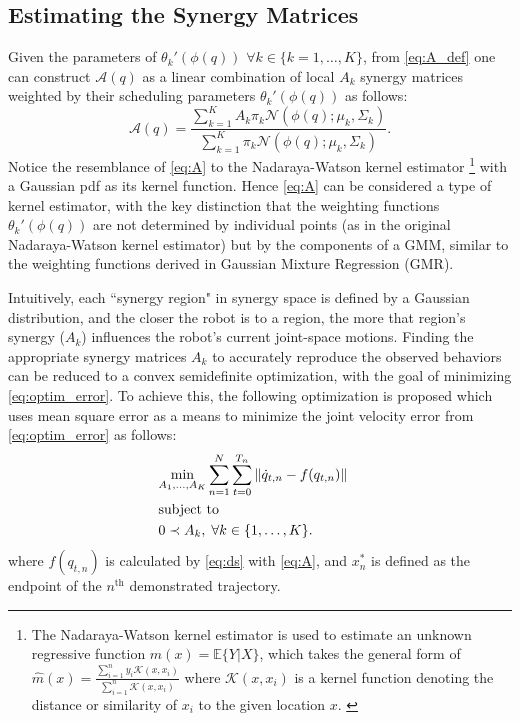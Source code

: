 \documentclass[letterpaper, 10 pt, conference,fleqn]{ieeeconf}
\begin{document}
\subsection{Estimating the Synergy Matrices}
Given the parameters of $\theta_k'(\phi(q))$ $\forall k \in \{k=1,\dots,K\}$, from \eqref{eq:A_def} one can construct $\mathcal{A}(q)$ as a linear combination of local $A_k$ synergy matrices weighted by their scheduling parameters $\theta_k'(\phi(q))$ as follows: 
\begin{equation}
\label{eq:A}
\mathcal{A}(q) = \frac{\sum_{k=1}^K A_k \pi_k\mathcal{N}(\phi(q); \mu_k, \Sigma_k)}{\sum_{k=1}^K \pi_k\mathcal{N} (\phi(q); \mu_k, \Sigma_k)}.
\end{equation} 
Notice the resemblance of \eqref{eq:A} to the Nadaraya-Watson kernel estimator \cite{nadaraya1964regress,watson1964regress}\footnote{The Nadaraya-Watson kernel estimator is used to estimate an unknown regressive function $m(x) = \mathbb{E}\{Y|X\}$, which takes the general form of $\widehat{m}(x) = \frac{\sum_{i=1}^n y_i \mathcal{K}(x,x_i)}{\sum_{i=1}^n \mathcal{K}(x,x_i)}$ where $\mathcal{K}(x,x_i)$ is a kernel function denoting the distance or similarity of $x_i$ to the given location $x$. \cite{nadaraya1964regress,watson1964regress}} with a Gaussian pdf as its kernel function. Hence \eqref{eq:A} can be considered a type of kernel estimator, with the key distinction that the weighting functions $\theta_k'(\phi(q))$ are not determined by individual points (as in the original Nadaraya-Watson kernel estimator) but by the components of a GMM, similar to the weighting functions derived in Gaussian Mixture Regression (GMR). 

Intuitively, each ``synergy region" in synergy space is defined by a Gaussian distribution, and the closer the robot is to a region, the more that region's synergy ($A_k$) influences the robot's current joint-space motions. Finding the appropriate synergy matrices $A_k$ to accurately reproduce the observed behaviors can be reduced to a convex semidefinite optimization, with the goal of minimizing \eqref{eq:optim_error}. To achieve this, the following optimization is proposed which uses mean square error as a means to minimize the joint velocity error from \eqref{eq:optim_error} as follows:
\begin{equation}
\vspace{-10pt}
\begin{aligned}
&\underset{A_1, \dots, A_K}{\text{min}} 
\sum_{n=1}^N\sum_{t=0}^{T_n} \left \| \dot{q}_{t,n} - f(q_{t,n}) \right \| \\
& \text{subject to}&\\
&  0 \prec A_k, \; \forall k \in \{1, \dots, K\}. &
\end{aligned}
\label{eq:opt}
\end{equation}
where $f(q_{t,n})$ is calculated by %
 \eqref{eq:ds} with \eqref{eq:A}, and $x^*_{n}$ is defined as the endpoint of the $ n^{\text{th}} $ demonstrated trajectory.
\end{document}
